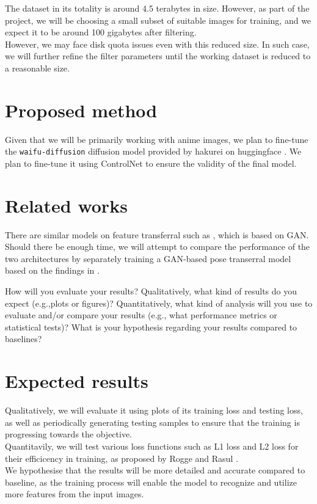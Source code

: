 \documentclass{article}
\begin{document}
The dataset in its totality is around 4.5 terabytes in size. However, as part of the project, we will be choosing a small subset of suitable images for training, and we expect it to be around 100 gigabytes after filtering.\\
However, we may face disk quota issues even with this reduced size. In such case, we will further refine the filter parameters until the working dataset is reduced to a reasonable size.

\section{Proposed method}
Given that we will be primarily working with anime images, we plan to fine-tune the \texttt{waifu-diffusion} diffusion model provided by hakurei on huggingface \cite{waifu-diffusion}. We plan to fine-tune it using ControlNet to ensure the validity of the final model.\\

\section{Related works}
There are similar models on feature transferral such as \cite{9050061}, which is based on GAN. Should there be enough time, we will attempt to compare the performance of the two architectures by separately training a GAN-based pose transerral model based on the findings in \cite{9050061}.

How will you evaluate your results? Qualitatively, what kind of results do you expect (e.g.,plots or figures)? Quantitatively, what kind of analysis will you use to evaluate and/or compare your results (e.g., what performance metrics or statistical tests)? What is your hypothesis regarding your results compared to baselines?
\section{Expected results}
Qualitatively, we will evaluate it using plots of its training loss and testing loss, as well as periodically generating testing samples to ensure that the training is progressing towards the objective.\\
Quantitavily, we will test various loss functions such as L1 loss and L2 loss for their efficicency in training, as proposed by Rogge and Rasul \cite{annotated-diffusion}.\\
We hypothesise that the results will be more detailed and accurate compared to baseline, as the training process will enable the model to recognize and utilize more features from the input images.



\end{document}
